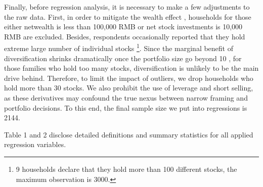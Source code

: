 \documentclass[ukenglish,nottitlepage,thmsb,11pt,letterpaper]{article}
\begin{document}
Finally, before regression analysis, it is necessary to make a few adjustments to the raw data. First, in order to mitigate the wealth effect \citep{Vissing-Jorgensen2002,Vissing-Jorgensen2003,Goetzmann2008}, households for those either netwealth is less than 100,000 RMB or net stock investments is 10,000 RMB are excluded. Besides, respondents occasionally reported that they hold extreme large number of individual stocks \footnote{ 9 households declare that they hold more than 100 different stocks, the maximum observation is 3000.}. Since the marginal benefit of diversification shrinks dramatically once the portfolio size go beyond 10 \citep{Evans1968}, for those families who hold too many stocks, diversification is unlikely to be the main drive behind. Therefore, to limit the impact of outliers, we drop households who hold more than 30 stocks. We also prohibit the use of leverage and short selling, as these derivatives may confound the true nexus between narrow framing and portfolio decisions. To this end, the final sample size we put into regressions is 2144.

Table 1 and 2 disclose detailed definitions and summary statistics for all applied regression variables. 
 
\end{document}
